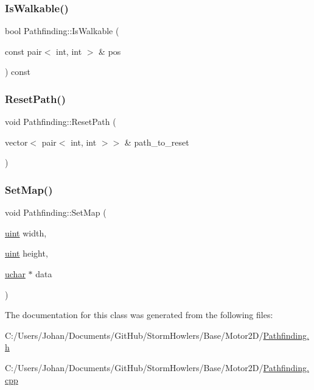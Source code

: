 \subsubsection{\texorpdfstring{IsWalkable()}{IsWalkable()}}
{\footnotesize\ttfamily bool Pathfinding\+::\+Is\+Walkable (\begin{DoxyParamCaption}\item[{const pair$<$ int, int $>$ \&}]{pos }\end{DoxyParamCaption}) const}

\mbox{\label{class_pathfinding_ae4aeb687f1532dcd340204e35a415d9e}} 
\subsubsection{\texorpdfstring{ResetPath()}{ResetPath()}}
{\footnotesize\ttfamily void Pathfinding\+::\+Reset\+Path (\begin{DoxyParamCaption}\item[{vector$<$ pair$<$ int, int $>$$>$ \&}]{path\+\_\+to\+\_\+reset }\end{DoxyParamCaption})}

\mbox{\label{class_pathfinding_a375f914454c44e1ca70545853a950efe}} 
\subsubsection{\texorpdfstring{SetMap()}{SetMap()}}
{\footnotesize\ttfamily void Pathfinding\+::\+Set\+Map (\begin{DoxyParamCaption}\item[{\mbox{\hyperlink{_defs_8h_a91ad9478d81a7aaf2593e8d9c3d06a14}{uint}}}]{width,  }\item[{\mbox{\hyperlink{_defs_8h_a91ad9478d81a7aaf2593e8d9c3d06a14}{uint}}}]{height,  }\item[{\mbox{\hyperlink{_defs_8h_a65f85814a8290f9797005d3b28e7e5fc}{uchar}} $\ast$}]{data }\end{DoxyParamCaption})}



The documentation for this class was generated from the following files\+:\begin{DoxyCompactItemize}
\item 
C\+:/\+Users/\+Johan/\+Documents/\+Git\+Hub/\+Storm\+Howlers/\+Base/\+Motor2\+D/\mbox{\hyperlink{_pathfinding_8h}{Pathfinding.\+h}}\item 
C\+:/\+Users/\+Johan/\+Documents/\+Git\+Hub/\+Storm\+Howlers/\+Base/\+Motor2\+D/\mbox{\hyperlink{_pathfinding_8cpp}{Pathfinding.\+cpp}}\end{DoxyCompactItemize}
